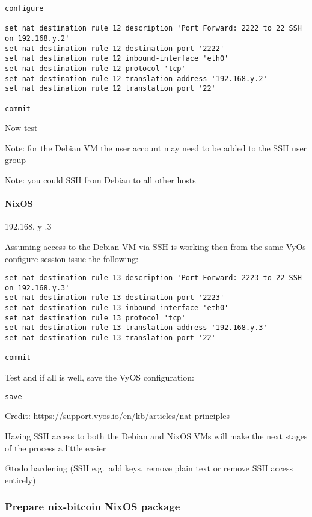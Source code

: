 \begin{verbatim}
configure

set nat destination rule 12 description 'Port Forward: 2222 to 22 SSH on 192.168.y.2'
set nat destination rule 12 destination port '2222'
set nat destination rule 12 inbound-interface 'eth0'
set nat destination rule 12 protocol 'tcp'
set nat destination rule 12 translation address '192.168.y.2'
set nat destination rule 12 translation port '22'

commit
\end{verbatim}

Now test

Note: for the Debian VM the user account may need to be added to the SSH
user group

Note: you could SSH from Debian to all other hosts

\hypertarget{nixos}{%
\paragraph{NixOS}\label{nixos}}

192.168. y .3

Assuming access to the Debian VM via SSH is working then from the same
VyOs configure session issue the following:

\begin{verbatim}
set nat destination rule 13 description 'Port Forward: 2223 to 22 SSH on 192.168.y.3'
set nat destination rule 13 destination port '2223'
set nat destination rule 13 inbound-interface 'eth0'
set nat destination rule 13 protocol 'tcp'
set nat destination rule 13 translation address '192.168.y.3'
set nat destination rule 13 translation port '22'

commit
\end{verbatim}

Test and if all is well, save the VyOS configuration:

\begin{verbatim}
save
\end{verbatim}

Credit: https://support.vyos.io/en/kb/articles/nat-principles

Having SSH access to both the Debian and NixOS VMs will make the next
stages of the process a little easier

@todo hardening (SSH e.g.~add keys, remove plain text or remove SSH
access entirely)

\hypertarget{prepare-nix-bitcoin-nixos-package}{%
\subsubsection{Prepare nix-bitcoin NixOS
package}\label{prepare-nix-bitcoin-nixos-package}}

